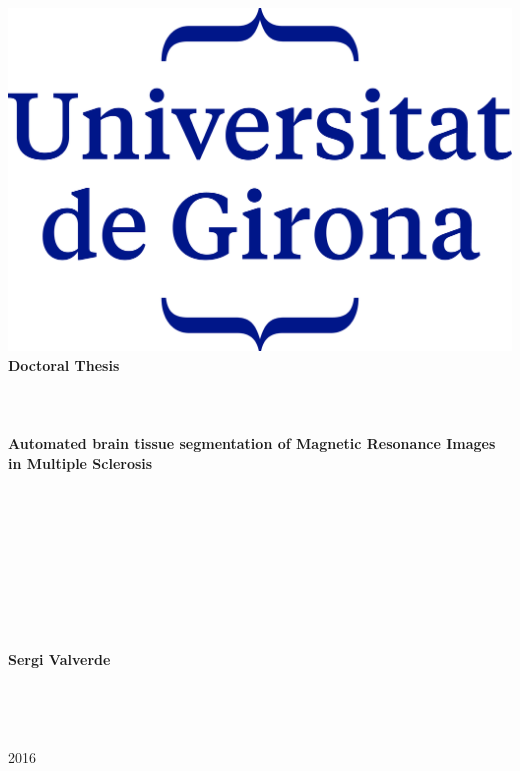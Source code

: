 \hspace{-1.25cm}
\parbox[c]{15cm}{
  \centering
  \includegraphics[scale = 1]{./figures/logo-udg.png}\\
  \vspace{2cm}
  {\textbf{Doctoral Thesis}}\\
  \quad \\
  \quad \\ ~\\
  {
    \LARGE \textbf{Automated brain tissue segmentation of Magnetic Resonance Images in Multiple Sclerosis }
  }\\~\\
  \quad \\
  \quad \\
  \quad \\
  \quad \\
  \quad \\
  \quad \\
  \quad \\
  \quad \\
  \textbf{Sergi Valverde}\\
  \quad \\
  \quad \\
  \quad \\
  \quad \\
  2016\\
  \quad \\
  \quad \\
}
\newpage
~\\

